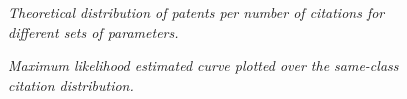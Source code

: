 \documentclass[letterpaper,12pt]{article}
\theoremstyle{definition}
\begin{document}
\begin{figure}[htb]\centering \captionsetup{width=5.8in}
    \caption{\label{fig:ImpactPar}\textit{Theoretical distribution of patents per number of citations for different sets of parameters.}}
\end{figure}

\begin{figure}[htb]\centering \captionsetup{width=5.8in}
    \caption{\label{fig:MLE}\textit{Maximum likelihood estimated curve plotted over the same-class citation distribution.}}
\end{figure}
\end{document}
